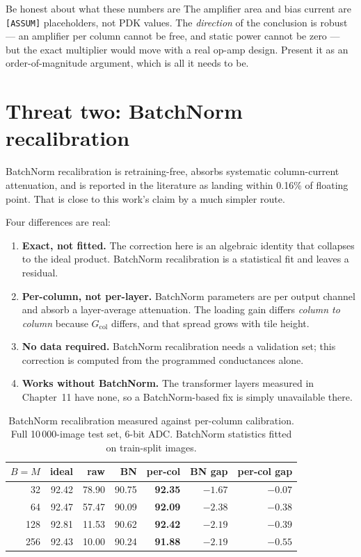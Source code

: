 \documentclass[11pt,a4paper]{report}
\newcommand{\Gcol}{G_{\mathrm{col}}}
\begin{document}
\begin{warnbox}{Be honest about what these numbers are}
The amplifier area and bias current are \texttt{[ASSUM]} placeholders, not PDK
values. The \emph{direction} of the conclusion is robust --- an amplifier per
column cannot be free, and static power cannot be zero --- but the exact
multiplier would move with a real op-amp design. Present it as an
order-of-magnitude argument, which is all it needs to be.
\end{warnbox}

\section{Threat two: BatchNorm recalibration}

BatchNorm recalibration is retraining-free, absorbs systematic column-current
attenuation, and is reported in the literature as landing within 0.16\% of
floating point. That is close to this work's claim by a much simpler route.

Four differences are real:

\begin{enumerate}[leftmargin=1.5em]
  \item \textbf{Exact, not fitted.} The correction here is an algebraic
        identity that collapses to the ideal product. BatchNorm recalibration
        is a statistical fit and leaves a residual.
  \item \textbf{Per-column, not per-layer.} BatchNorm parameters are per
        output channel and absorb a layer-average attenuation. The loading
        gain differs \emph{column to column} because $\Gcol$ differs, and that
        spread grows with tile height.
  \item \textbf{No data required.} BatchNorm recalibration needs a validation
        set; this correction is computed from the programmed conductances
        alone.
  \item \textbf{Works without BatchNorm.} The transformer layers measured in
        Chapter~11 have none, so a BatchNorm-based fix is simply unavailable
        there.
\end{enumerate}

\begin{table}[h]
\centering
\caption{BatchNorm recalibration measured against per-column calibration.
Full 10\,000-image test set, 6-bit ADC. BatchNorm statistics fitted on
train-split images.}
\begin{tabular}{rrrrrrr}
\toprule
$B{=}M$ & ideal & raw & BN & per-col & BN gap & per-col gap \\
\midrule
32  & 92.42 & 78.90 & 90.75 & \textbf{92.35} & $-1.67$ & $\mathbf{-0.07}$ \\
64  & 92.47 & 57.47 & 90.09 & \textbf{92.09} & $-2.38$ & $\mathbf{-0.38}$ \\
128 & 92.81 & 11.53 & 90.62 & \textbf{92.42} & $-2.19$ & $\mathbf{-0.39}$ \\
256 & 92.43 & 10.00 & 90.24 & \textbf{91.88} & $-2.19$ & $\mathbf{-0.55}$ \\
\bottomrule
\end{tabular}
\end{table}
\end{document}
